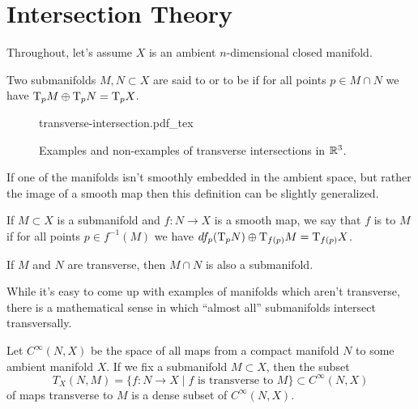 
\section{Intersection Theory}

Throughout, let's assume $X$ is an ambient $n$-dimensional closed manifold.

\begin{definition}
	Two submanifolds $M,N\subset X$ are said to  or to be  if for all points $p\in M\cap N$ we have $\mathrm{T}_p M\oplus \mathrm{T}_p N = \mathrm{T}_p X$.
\end{definition}

	\begin{figure}[ht]
		\centering
		{transverse-intersection.pdf_tex}
		\medskip
		\caption{Examples and non-examples of transverse intersections in $\mathbb{R}^3$.}\label{fig:transverse-intersection}
	\end{figure}

	If one of the manifolds isn't smoothly embedded in the ambient space, but rather the image of a smooth map then this definition can be slightly generalized.

\begin{definition}
	If $M\subset X$ is a submanifold and $f : N \to X$ is a smooth map, we say that $f$ is  to $M$ if for all points $p\in f^{-1}(M)$ we have $df_p(\mathrm{T}_p N)\oplus \mathrm{T}_{f(p)}M = \mathrm{T}_{f(p)}X$.
\end{definition}

\begin{theorem}
\end{theorem}

\begin{proposition}
	If $M$ and $N$ are transverse, then $M\cap N$ is also a submanifold.
\end{proposition}

While it's easy to come up with examples of manifolds which aren't transverse, there is a mathematical sense in which ``almost all'' submanifolds intersect transversally.

\begin{theorem}
	Let $C^\infty(N,X)$ be the space of all maps from a compact manifold $N$ to some ambient manifold $X$. If we fix a submanifold $M\subset X$, then the subset
	\[
		T_X(N,M) = \{ f : N \to X \mid f\textrm{ is transverse to } M\}\subset C^\infty(N,X)
	\]
	of maps transverse to $M$ is a dense subset of $C^\infty(N,X)$.
\end{theorem}

